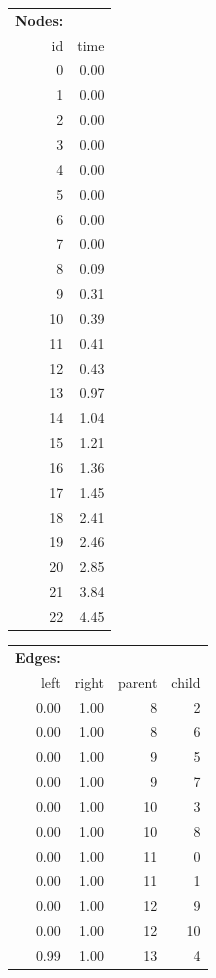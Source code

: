 \documentclass[fontscale=0.38,a0paper]{baposter}
\begin{document}
\begin{poster}
{    \noindent
    \tiny
\hfill
\begin{tabular}{|rr|}
  \hline
    \textbf{Nodes:} & \\
id & time \\ 
  \hline
  0 & 0.00 \\ 
    1 & 0.00 \\ 
    2 & 0.00 \\ 
    3 & 0.00 \\ 
    4 & 0.00 \\ 
    5 & 0.00 \\ 
    6 & 0.00 \\ 
    7 & 0.00 \\ 
    8 & 0.09 \\ 
    9 & 0.31 \\ 
   10 & 0.39 \\ 
   11 & 0.41 \\ 
   12 & 0.43 \\ 
   13 & 0.97 \\ 
   14 & 1.04 \\ 
   15 & 1.21 \\ 
   16 & 1.36 \\ 
   17 & 1.45 \\ 
   18 & 2.41 \\ 
   19 & 2.46 \\ 
   20 & 2.85 \\ 
   21 & 3.84 \\ 
   22 & 4.45 \\ 
   \hline
\end{tabular}
\hfill
\begin{tabular}{|rrrr|}
  \hline
    \textbf{Edges:} & & & \\
left & right & parent & child \\ 
  \hline
0.00 & 1.00 &   8 &   2 \\ 
  0.00 & 1.00 &   8 &   6 \\ 
  0.00 & 1.00 &   9 &   5 \\ 
  0.00 & 1.00 &   9 &   7 \\ 
  0.00 & 1.00 &  10 &   3 \\ 
  0.00 & 1.00 &  10 &   8 \\ 
  0.00 & 1.00 &  11 &   0 \\ 
  0.00 & 1.00 &  11 &   1 \\ 
  0.00 & 1.00 &  12 &   9 \\ 
  0.00 & 1.00 &  12 &  10 \\ 
  0.99 & 1.00 &  13 &   4 \\ 

\end{tabular}}
\end{poster}
\end{document}
